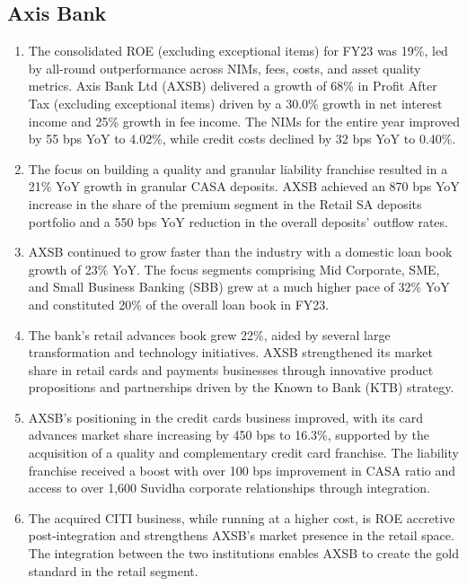 \subsection{Axis Bank}
\begin{enumerate}
    \item The consolidated ROE (excluding exceptional items) for FY23 was 19\%, led by all-round outperformance across NIMs, fees, costs, and asset quality metrics. Axis Bank Ltd (AXSB) delivered a growth of 68\% in Profit After Tax (excluding exceptional items) driven by a 30.0\% growth in net interest income and 25\% growth in fee income. The NIMs for the entire year improved by 55 bps YoY to 4.02\%, while credit costs declined by 32 bps YoY to 0.40\%.
    
    \item The focus on building a quality and granular liability franchise resulted in a 21\% YoY growth in granular CASA deposits. AXSB achieved an 870 bps YoY increase in the share of the premium segment in the Retail SA deposits portfolio and a 550 bps YoY reduction in the overall deposits' outflow rates.
    
    \item AXSB continued to grow faster than the industry with a domestic loan book growth of 23\% YoY. The focus segments comprising Mid Corporate, SME, and Small Business Banking (SBB) grew at a much higher pace of 32\% YoY and constituted 20\% of the overall loan book in FY23.
    
    \item The bank's retail advances book grew 22\%, aided by several large transformation and technology initiatives. AXSB strengthened its market share in retail cards and payments businesses through innovative product propositions and partnerships driven by the Known to Bank (KTB) strategy.
    
    \item AXSB's positioning in the credit cards business improved, with its card advances market share increasing by 450 bps to 16.3\%, supported by the acquisition of a quality and complementary credit card franchise. The liability franchise received a boost with over 100 bps improvement in CASA ratio and access to over 1,600 Suvidha corporate relationships through integration.
    
    \item The acquired CITI business, while running at a higher cost, is ROE accretive post-integration and strengthens AXSB's market presence in the retail space. The integration between the two institutions enables AXSB to create the gold standard in the retail segment.
    

\end{enumerate}
